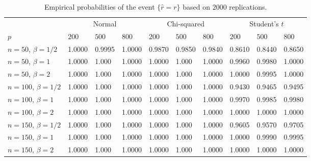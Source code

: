 \documentclass[3p]{elsarticle}
\theoremstyle{plain}
\theoremstyle{definition}
\theoremstyle{remark}
\begin{document}
\begin{table}[ht]
    \caption{Empirical probabilities of the event $\{\hat{r}=r\}$ based on $2000$ replications.} 
\label{newnewtable}
\vspace{3mm}
\centering
\begin{tabular}{llllllllll}
\toprule
    &   \multicolumn{3}{c}{Normal} & \multicolumn{3}{c}{Chi-squared}& \multicolumn{3}{c}{Student's $t$}  \\
    \cmidrule(r){2-4}
\cmidrule(r){5-7}
\cmidrule(r){8-10}
    $p$ & $200$ &  $500$ & $800$ & $200$  & $500$ & $800$ & $200$ & $500$ & $800$ \\ 
\midrule
    $n=50$, $\beta=1/2$ & 1.0000 & 0.9995& 1.0000 &0.9870&0.9850&0.9840&0.8610&0.8440&0.8650\\
    $n=50$, $\beta=1$ & 1.0000 & 1.000 & 1.0000 & 1.0000 & 1.000 & 1.0000 & 0.9960 & 0.9980 & 1.0000\\
    $n=50$, $\beta=2$ & 1.0000 & 1.000 & 1.0000 & 1.0000 & 1.000 & 1.0000 & 1.0000 & 0.9995 & 1.0000\\
    \midrule
    $n=100$, $\beta=1/2$ & 1.0000 & 1.000 & 1.0000 & 1.0000 & 1.000 & 1.0000 & 0.9430 & 0.9465 & 0.9495 \\
    $n=100$, $\beta=1$ & 1.0000 & 1.000 & 1.0000 & 1.0000 & 1.000 & 1.0000 & 0.9970 & 0.9985 & 0.9980\\
    $n=100$, $\beta=2$ & 1.0000 & 1.000 & 1.0000 & 1.0000 & 1.000 & 1.0000  & 1.0000 & 1.0000 & 1.0000\\
    \midrule
    $n=150$, $\beta=1/2$ & 1.0000 & 1.000 & 1.0000 & 1.0000 & 1.000 & 1.0000 & 0.9605 & 0.9570 & 0.9705 \\
    $n=150$, $\beta=1$ & 1.0000 & 1.000 & 1.0000 & 1.0000 & 1.000 & 1.0000 & 1.0000 & 0.9990 & 0.9995 \\
    $n=150$, $\beta=2$ & 1.0000 & 1.000 & 1.0000 & 1.0000 & 1.000 & 1.0000 & 1.0000 & 1.0000 & 1.0000 \\
\bottomrule
\end{tabular}
\end{table}




\end{document}
